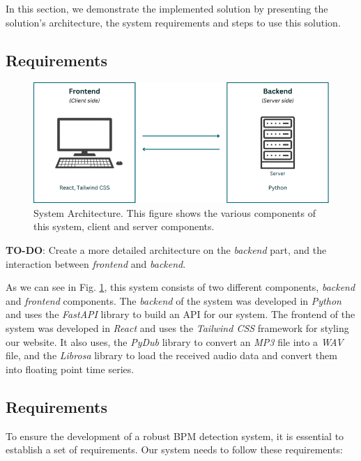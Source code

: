 \documentclass{IEEEtran}
\begin{document}
In this section, we demonstrate the implemented solution by presenting the solution's architecture, the system requirements and steps to use this solution.

\subsection{Requirements}

\begin{figure}[h]
    \centering
    \includegraphics[scale=0.4]{imgs/simple_architecture.png}
    \caption{System Architecture. This figure shows the various components of this system, client and server components.}
    \label{fig:simple_architecture}
\end{figure}

\textbf{TO-DO}: Create a more detailed architecture on the \textit{backend} part, and the interaction between \textit{frontend} and \textit{backend}.

As we can see in Fig. \ref{fig:simple_architecture}, this system consists of two different components, \textit{backend} and \textit{frontend} components. The \textit{backend} of the system was developed in \textit{Python} and uses the \textit{FastAPI} library to build an API for our system. The frontend of the system was developed in \textit{React} and uses the \textit{Tailwind CSS} framework for styling our website. It also uses, the \textit{PyDub} library to convert an \textit{MP3} file into a \textit{WAV} file, and the \textit{Librosa} library to load the received audio data and convert them into floating point time series.

\subsection{Requirements}

To ensure the development of a robust BPM detection system, it is essential to establish a set of requirements. Our system needs to follow these requirements:
\end{document}
